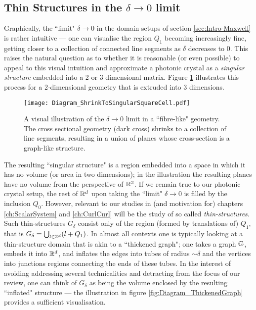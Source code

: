 \subsection{Thin Structures in the $\delta\rightarrow0$ limit} \label{ssec:Intro-ThinStructures}
Graphically, the ``limit" $\delta\rightarrow0$ in the domain setups of section \ref{sec:Intro-Maxwell} is rather intuitive --- one can visualise the region $Q_1$ becoming increasingly fine, getting closer to a collection of connected line segments as $\delta$ decreases to 0.
This raises the natural question as to whether it is reasonable (or even possible) to appeal to this visual intuition and approximate a photonic crystal as a \emph{singular structure} embedded into a 2 or 3 dimensional matrix.
Figure \ref{fig:Diagram_ShrinkToSingularSquareCell} illustrates this process for a 2-dimensional geometry that is extruded into 3 dimensions.
\begin{figure}[b]
	\centering
	\texttt{[image: Diagram\_ShrinkToSingularSquareCell.pdf]}
	\caption[Visual illustration of the singular limit of a thin-structure geometry.]{\label{fig:Diagram_ShrinkToSingularSquareCell} A visual illustration of the $\delta\rightarrow0$ limit in a ``fibre-like" geometry. The cross sectional geometry (dark cross) shrinks to a collection of line segments, resulting in a union of planes whose cross-section is a graph-like structure.}
\end{figure}
The resulting ``singular structure" is a region embedded into a space in which it has no volume (or area in two dimensions); in the illustration the resulting planes have no volume from the perspective of $\mathbb{R}^3$.
If we remain true to our photonic crystal setup, the rest of $\mathbb{R}^d$ upon taking the ``limit" $\delta\rightarrow0$ is filled by the inclusion $Q_0$.
However, relevant to our studies in (and motivation for) chapters \ref{ch:ScalarSystem} and \ref{ch:CurlCurl} will be the study of so called \emph{thin-structures}.
Such thin-structures $G_{\delta}$ consist only of the region (formed by translations of) $Q_1$, that is $G_{\delta} = \bigcup_{l\in\mathbb{Z}^d}(l+Q_1)$.
In almost all contexts one is typically looking at a thin-structure domain that is akin to a ``thickened graph"; one takes a graph $\mathbb{G}$, embeds it into $\mathbb{R}^d$, and inflates the edges into tubes of radius $\sim\delta$ and the vertices into junctions regions connecting the ends of these tubes.
In the interest of avoiding addressing several technicalities and detracting from the focus of our review, one can think of $G_{\delta}$ as being the volume enclosed by the resulting ``inflated" structure --- the illustration in figure \ref{fig:Diagram_ThickenedGraph} provides a sufficient visualisation.
